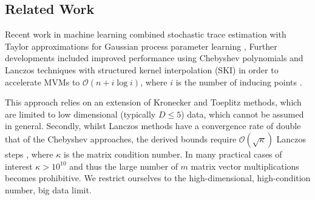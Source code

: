 \documentclass[letterpaper]{article} %
\begin{document}
\subsection{Related Work}
Recent work in machine learning combined stochastic trace estimation with Taylor approximations for Gaussian process parameter learning \cite{zhang2007approximate, boutsidis2017randomized}, %
Further developments included improved performance using Chebyshev polynomials \cite{han2015large} and Lanczos techniques with structured kernel interpolation (SKI) in order to accelerate MVMs to $\mathcal{O}(n+i\log i)$, where $i$ is the number of inducing points \cite{dong2017scalable}. 

This approach relies on an extension of Kronecker and Toeplitz methods, which are limited to low dimensional (typically $D \leq 5$) data, which cannot be assumed in general.  Secondly, whilst Lanczos methods have a convergence rate of double that of the Chebyshev approaches, the derived bounds require $\mathcal{O}(\sqrt{\kappa})$ Lanczos steps \cite{Ubaru2016}, where $\kappa$ is the matrix condition number. In many practical cases of interest $\kappa > 10^{10}$ and thus the large number of $m$ matrix vector multiplications becomes prohibitive. 
We restrict ourselves to the high-dimensional, high-condition number, big data limit. 
\end{document}
